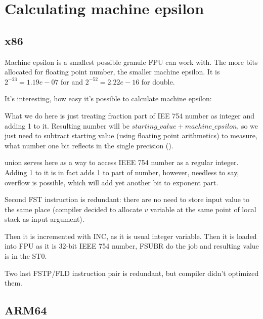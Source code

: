 ﻿\ifdefined\RUSSIAN
\else
\section{Calculating machine epsilon}

\subsection{x86}

Machine epsilon is a smallest possible granule \ac{FPU} can work with.
The more bits allocated for floating point number, the smaller machine epsilon.
It is $2^{-23} = 1.19e-07$ for \Tfloat and $2^{-52} = 2.22e-16$ for double.

It's interesting, how easy it's possible to calculate machine epsilon:



What we do here is just treating fraction part of IEE 754 number as integer and adding 1 to it.
Resulting number will be $starting\_value+machine\_epsilon$, so we just need to subtract
starting value (using floating point arithmetics) to measure, what number one bit reflects
in the single precision (\Tfloat).

union serves here as a way to access IEEE 754 number as a regular integer.
Adding 1 to it is in fact adds 1 to  part of number, however, needless to say,
overflow is possible, which will add yet another bit to exponent part.



Second FST instruction is redundant: there are no need to store input value to the same
place (compiler decided to allocate $v$ variable at the same point of local stack as input 
argument).

Then it is incremented with INC, as it is usual integer variable.
Then it is loaded into FPU as it is 32-bit IEEE 754 number, FSUBR do the job and resulting
value is in the ST0.

Two last FSTP/FLD instruction pair is redundant, but compiler didn't optimized them.

\ifdefined\IncludeARM
\subsection{ARM64}

